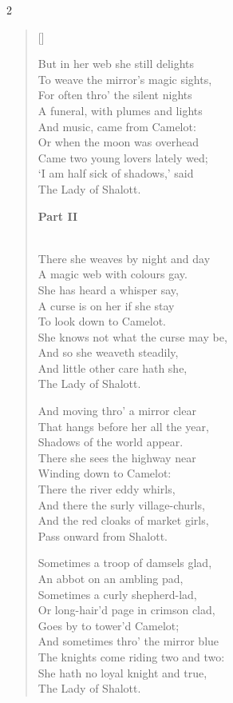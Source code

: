 \begin{paracol}{2}
\begin{verse}[\versewidth]
\begin{patverse}
But in her web she still delights\\
To weave the mirror's magic sights,\\
For often thro' the silent nights\\
A funeral, with plumes and lights\\
And music, came from Camelot:\\
Or when the moon was overhead\\
Came two young lovers lately wed;\\
`I am half sick of shadows,' said\\
The Lady of Shalott.  \end{patverse}\switchcolumn

\textbf{Part II}
\begin{patverse}
\phantom{.}\\
There she weaves by night and day\\
A magic web with colours gay.\\
She has heard a whisper say,\\
A curse is on her if she stay\\
To look down to Camelot.\\
She knows not what the curse may be,\\
And so she weaveth steadily,\\
And little other care hath she,\\
The Lady of Shalott.
\end{patverse}

\begin{patverse}
And moving thro' a mirror clear\\
That hangs before her all the year,\\
Shadows of the world appear.\\
There she sees the highway near\\
Winding down to Camelot:\\
There the river eddy whirls,\\
And there the surly village-churls,\\
And the red cloaks of market girls,\\
Pass onward from Shalott.
\end{patverse}

\begin{patverse}
Sometimes a troop of damsels glad,\\
An abbot on an ambling pad,\\
Sometimes a curly shepherd-lad,\\
Or long-hair'd page in crimson clad,\\
Goes by to tower'd Camelot;\\
And sometimes thro' the mirror blue\\
The knights come riding two and two:\\
She hath no loyal knight and true,\\
The Lady of Shalott.
\end{patverse}


\end{verse}
\end{paracol}
